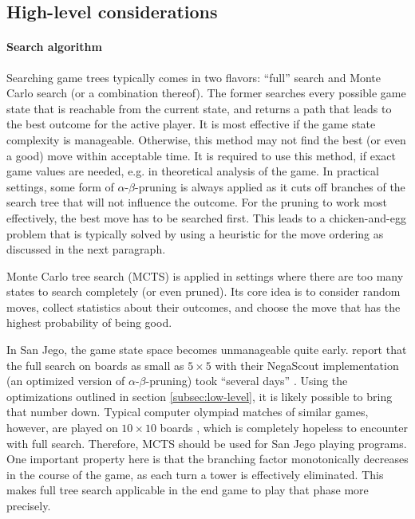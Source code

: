 \documentclass[sigconf]{acmart}
\begin{document}
\subsection{High-level considerations}
\paragraph{Search algorithm}
Searching game trees typically comes in two flavors:
\enquote{full} search and Monte Carlo search (or a combination thereof).
The former searches every possible game state that is reachable from the current state, and returns a path that leads to the best outcome for the active player.
It is most effective if the game state complexity is manageable.
Otherwise, this method may not find the best (or even a good) move within acceptable time.
It is required to use this method, if exact game values are needed, e.g. in theoretical analysis of the game.
In practical settings, some form of $\alpha$-$\beta$-pruning is always applied as it cuts off branches of the search tree that will not influence the outcome.
For the pruning to work most effectively, the best move has to be searched first.
This leads to a chicken-and-egg problem that is typically solved by using a heuristic for the move ordering as discussed in the next paragraph.

Monte Carlo tree search (MCTS) is applied in settings where there are too many states to search completely (or even pruned).
Its core idea is to consider random moves, collect statistics about their outcomes, and choose the move that has the highest probability of being good.

In San Jego, the game state space becomes unmanageable quite early.
\citeauthor{Althöfer2020} report that the full search on boards as small as $5\times5$ with their NegaScout implementation (an optimized version of $\alpha$-$\beta$-pruning) took \enquote{several days} \cite[p.~8]{Althöfer2020}.
Using the optimizations outlined in section \ref{subsec:low-level}, it is likely possible to bring that number down.
Typical computer olympiad matches of similar games, however, are played on $10\times10$ boards \cite{Wojciech2011}, which is completely hopeless to encounter with full search.
Therefore, MCTS should be used for San Jego playing programs.
One important property here is that the branching factor monotonically decreases in the course of the game, as each turn a tower is effectively eliminated.
This makes full tree search applicable in the end game to play that phase more precisely.
\end{document}
